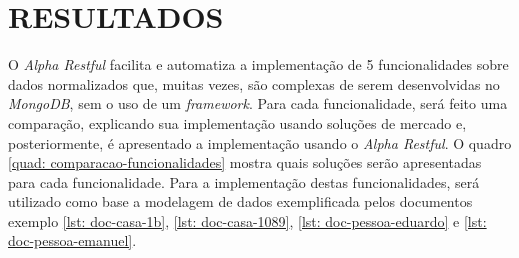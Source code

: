 \chapter{RESULTADOS}
\label{Resultados}

O \textit{Alpha Restful} facilita e automatiza a implementação de 5 funcionalidades sobre dados normalizados que,
muitas vezes,
são complexas de serem desenvolvidas no \textit{MongoDB}, sem o uso de um \textit{framework}. Para cada funcionalidade, será feito uma comparação, explicando sua implementação usando soluções de mercado e, posteriormente, é apresentado a implementação usando o \textit{Alpha Restful}. O quadro \ref{quad: comparacao-funcionalidades} mostra quais soluções serão apresentadas para cada funcionalidade. Para a implementação destas funcionalidades, será utilizado como base a modelagem de dados exemplificada pelos documentos exemplo \ref{lst: doc-casa-1b}, \ref{lst: doc-casa-1089}, \ref{lst: doc-pessoa-eduardo} e \ref{lst: doc-pessoa-emanuel}.

